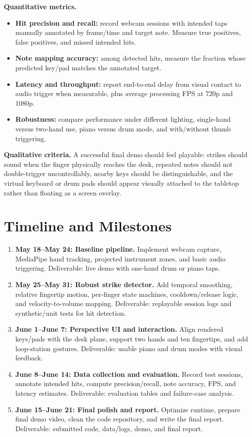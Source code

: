 \documentclass[10pt]{article}
\begin{document}
\textbf{Quantitative metrics.}
\begin{itemize}
    \item \textbf{Hit precision and recall:} record webcam sessions with intended taps manually annotated by frame/time and target note. Measure true positives, false positives, and missed intended hits.
    \item \textbf{Note mapping accuracy:} among detected hits, measure the fraction whose predicted key/pad matches the annotated target.
    \item \textbf{Latency and throughput:} report end-to-end delay from visual contact to audio trigger when measurable, plus average processing FPS at 720p and 1080p.
    \item \textbf{Robustness:} compare performance under different lighting, single-hand versus two-hand use, piano versus drum mode, and with/without thumb triggering.
\end{itemize}

\textbf{Qualitative criteria.} A successful final demo should feel playable: strikes should sound when the finger physically reaches the desk, repeated notes should not double-trigger uncontrollably, nearby keys should be distinguishable, and the virtual keyboard or drum pads should appear visually attached to the tabletop rather than floating as a screen overlay.

\section{Timeline and Milestones}
\begin{enumerate}
    \item \textbf{May 18--May 24: Baseline pipeline.} Implement webcam capture, MediaPipe hand tracking, projected instrument zones, and basic audio triggering. Deliverable: live demo with one-hand drum or piano taps.
    \item \textbf{May 25--May 31: Robust strike detector.} Add temporal smoothing, relative fingertip motion, per-finger state machines, cooldown/release logic, and velocity-to-volume mapping. Deliverable: replayable session logs and synthetic/unit tests for hit detection.
    \item \textbf{June 1--June 7: Perspective UI and interaction.} Align rendered keys/pads with the desk plane, support two hands and ten fingertips, and add loop-station gestures. Deliverable: usable piano and drum modes with visual feedback.
    \item \textbf{June 8--June 14: Data collection and evaluation.} Record test sessions, annotate intended hits, compute precision/recall, note accuracy, FPS, and latency estimates. Deliverable: evaluation tables and failure-case analysis.
    \item \textbf{June 15--June 21: Final polish and report.} Optimize runtime, prepare final demo video, clean the code repository, and write the final report. Deliverable: submitted code, data/logs, demo, and final report.
\end{enumerate}
\end{document}
